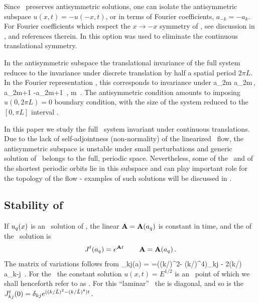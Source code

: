 Since \KSe\ preserves
antisymmetric solutions, one can isolate the antisymmetric
subspace 
$u(x,t)=-u(-x,t)$, or in terms of Fourier coefficients,
$a_{-k}= - a_k$. 
For Fourier coefficients which respect the $x \to -x$ symmetry of
\KSe, see discussion in ,
and references therein.
In  
this option was used to eliminate
the continuous translational symmetry.

In the antisymmetric subspace the translational 
invariance of the full system reduces
to the invariance under discrete
translation by half a spatial period $2\pi L$.
In the Fourier representation , 
this corresponds to invariance under 
\beq
a_{2m} \to a_{2m}\,, a_{2m+1} \to -a_{2m+1}
\,, m \in {}
\,.
The antisymmetric condition amounts to imposing
$u(0,2\pi L)=0$ boundary condition, with
the size of the system reduced to
the $[0, \pi L]$ interval 
.

In this paper we study the full \KS\ system invariant
under continuous translations. Due to the lack of self-adjointness
(non-normality) of the linearized \KS\ flow, 
the antisymmetric subspace
is unstable under small perturbations and generic solution of 
\KSe\ belongs to the full, periodic space. Nevertheless, some of
the \eqva\ and of the shortest periodic orbits lie in this subspace
and can play important role for the topology of the flow - examples
of such solutions will be discussed in .


\subsection{Stability of \eqva}
\label{s:StabEqui}

If $u_\stagn(x)$ is an \eqv\ solution of \KSe,
the linear {\stabmat}
${\bf \Mvar}={\bf \Mvar}(a_\stagn)$
is constant in time,
and  
the {\jacobianM}
of the \eqv\ solution is
\[
 \jMps^t(a_\stagn) = e^{{\bf \Mvar} t}
    \,\qquad
 {\bf \Mvar}={\bf \Mvar}(a_\stagn)
\,.
\]
The matrix of variations
follows from 
\beq
{\Mvar}_{kj}(a) =
=((k/\tildeL)^2- (k/\tildeL)^4)\delta_{kj} - 2(k/\tildeL) a_{k-j}
\,.
For the \KSe\ the constant solution $u(x,t)= E^{1/2}$ is an 
\eqv\ point of  which we shall henceforth refer to as
. For this ``laminar'' \eqv\ the {\stabmat}
is diagonal, and 
so is the {\jacobianM}
$
{J}^t_{kj}(0) = \delta_{kj} e^{((k/\tilde{L})^2- (k/\tilde{L})^4)t}
\,.
$


